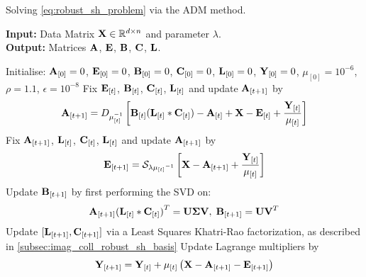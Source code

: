 \begin{algorithm}[t]
    \caption{Solving \cref{eq:robust_sh_problem} via the ADM method.}
\label{alg:imag_coll_adm_solution}
    {\textbf{Input:} Data Matrix $\boldsymbol{\mathbf{X}} \in \mathbb{R}^{d \times n}$ and parameter $\lambda$.} \\
    {\textbf{Output:} Matrices $\boldsymbol{\mathbf{A}}$, $\boldsymbol{\mathbf{E}}$, $\boldsymbol{\mathbf{B}}$, $\boldsymbol{\mathbf{C}}$, $\boldsymbol{\mathbf{L}}$.}  \\
{
    \def\At{{\bb{A}_{[t]}}}
    \def\Et{{\bb{E}_{[t]}}}
    \def\Ct{{\bb{C}_{[t]}}}
    \def\Lt{{\bb{L}_{[t]}}}
    \def\Bt{{\bb{B}_{[t]}}}
    \def\Yt{{\bb{Y}_{[t]}}}
    \def\mut{{\mu_{[t]}}}
    \def\X{{\bb{X}}}
    
    \begin{algorithmic}
        \State{}Initialise: $\boldsymbol{\mathbf{A}}_{[0]} = 0$, $\boldsymbol{\mathbf{E}}_{[0]} = 0$, $\boldsymbol{\mathbf{B}}_{[0]} = 0$, $\boldsymbol{\mathbf{C}}_{[0]} = 0$, $\boldsymbol{\mathbf{L}}_{[0]} = 0$, $\boldsymbol{\mathbf{Y}}_{[0]} = 0$, $\mu_{[0]} = 10^{-6}$, $\rho = 1.1$, $\epsilon = 10^{-8}$
            \State{}Fix $\Et$, $\Bt$, $\Ct$, $\Lt$ and update $\boldsymbol{\mathbf{A}}_{[t + 1]}$ by
                \begin{equation}\label{eq:A_update}
                    \bb{A}_{[t+1]} = D_{\mu_{[t]}^{-1}} \left[  \Bt ( \Lt \ast \Ct ) - \At + \X - \Et + \frac{\Yt}{\mut} \right]
                \end{equation}
            \State{}Fix $\boldsymbol{\mathbf{A}}_{[t+1]}$, $\Lt$, $\Ct$, $\Lt$ and update $\boldsymbol{\mathbf{A}}_{[t + 1]}$ by
                \begin{equation}\label{eq:E_update}
                    \bb{E}_{[t+1]} = \mathcal{S}_{\lambda \mut^{-1}} \left[ \X - \bb{A}_{[t+1]} + \frac{\Yt}{\mut} \right]
                \end{equation}
            \State{}Update $\boldsymbol{\mathbf{B}}_{[t+1]}$ by first performing the SVD on:
                \begin{equation}\label{eq:ALC_svd}
                    \bb{A}_{[t+1]} {(\Lt \ast \Ct)}^T = \bb{U} \bb{\Sigma} \bb{V}, \; \bb{B}_{[t+1]} = \bb{U} \bb{V}^T
                \end{equation}
            \State{}Update $[\boldsymbol{\mathbf{L}}_{[t+1]}, \boldsymbol{\mathbf{C}}_{[t+1]}]$ via a Least Squares Khatri-Rao factorization, as described in \cref{subsec:imag_coll_robust_sh_basis}
            \State{} Update Lagrange multipliers by
                \begin{equation}\label{eq:Y_update}
                    \bb{Y}_{[t+1]} = \Yt + \mut \left( \X - \bb{A}_{[t+1]} - \bb{E}_{[t+1]} \right)

\end{equation}
\end{algorithmic}}
\end{algorithm}
